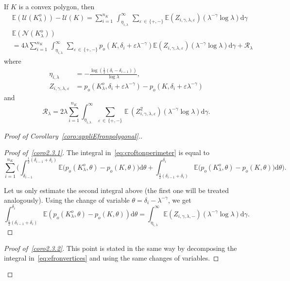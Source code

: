 \documentclass[AHL,Unicode,longabstracts,published]{cedram}
\newcommand{\cN}{\mathcal{N}}
\newcommand{\cR}{\mathcal{R}}
\newcommand{\cU}{\mathcal{U}}
\newcommand{\dd}{\mathrm{d}}
\newcommand{\E}{\mathbb{E}}
\newcommand{\eps}{\varepsilon}
\newcommand{\noi}{\noindent}
\newenvironment*{prooff}{\begin{proof}}{\let\qed\relax\end{proof}}
\newenvironment*{lastprooff}{\begin{proof}}{\end{proof}}
\begin{document}
\begin{coro}\label{coro:appliEfronpolygonal}
If $K$ is a convex polygon, then
\begin{align}
\tag{$\rm i$}\label{coro2.3.1} &\E(\cU(K_{\lambda}^o))-\cU(K) = \sum_{i=1}^{n_K}\,\int_{\eta_{i,\lambda}}^{\infty}\,\sum_{\varepsilon\,\in\,\{+,-\}} \E\left(Z_{i,\gamma,\lambda,\eps}\right)(\lambda^{-\gamma}\log \lambda)\dd\gamma \\
\tag{$\rm ii$}\label{coro2.3.2}  &\E(\cN(K_{\lambda}^o))\\
&= 4\lambda\sum_{i=1}^{n_K}\,\int_{\eta_{i,\lambda}}^{\infty}\,\sum_{\varepsilon\,\in\,\{+,-\}}p_o\left(K,\delta_i+\varepsilon\lambda^{-\gamma}\right)
\E(Z_{i,\gamma,\lambda,\eps})\left(\lambda^{-\gamma}\log\lambda\right)\dd\gamma+{\cR}_\lambda\nonumber
\end{align}
where
\begin{align*}
\eta_{i,\lambda}&=-\frac{\log \left(\frac{1}{2}(\delta_i-\delta_{i-1})\right)}{\log\lambda},\\
Z_{i,\gamma,\lambda,\eps}&= p_o\left(K_{\lambda}^o,\delta_i+\varepsilon\lambda^{-\gamma}\right)-p_o\left(K,\delta_i+\varepsilon\lambda^{-\gamma}\right)
\end{align*}
and
\begin{equation}\label{eq:defRlambdapolyg}
{\cR}_\lambda=2\lambda \sum_{i=1}^{n_K} \int_{\eta_{i,\lambda}}^{\infty} \sum_{\varepsilon\,\in\,\{+,-\}}\,\E\,\left(Z_{i,\gamma,\lambda,\eps}^2\right)\left(\lambda^{-\gamma}\log \lambda\right)\dd\gamma.
\end{equation}
\end{coro}

\begin{proof}[{Proof of Corollary~\ref{coro:appliEfronpolygonal}.}]

\begin{prooff}[{Proof of~\eqref{coro2.3.1}}]
The integral in~\eqref{eq:croftonperimeter} is equal to
\[
\sum_{i=1}^{n_K} \bigg(\int_{\delta_{i-1}}^{\frac1{2}\left(\delta_{i-1}+\delta_{i}\right)} \E\big(p_o(K_{\lambda}^o,\theta)-p_o(K,\theta)\big)\dd\theta + \int_{\frac1{2}\left(\delta_{i-1}+\delta_{i}\right)}^{\delta_{i}} \E\big(p_o(K_{\lambda}^o,\theta)-p_o(K,\theta)\big)\dd\theta\bigg).
\]

Let us only estimate the second integral above (the first one will be treated analogously). Using the change of variable $\theta=\delta_i-\lambda^{-\gamma}$, we get
\begin{equation*}\label{eq:perimpolyginterm0}
\int_{\frac1{2}\left(\delta_{i-1}+\delta_i\right)}^{\delta_i} \E(p_o(K_{\lambda}^o,\theta)-p_o(K,\theta))\dd\theta = \int_{\eta_{i,\lambda}}^{\infty} \E(Z_{i,\gamma,\lambda,-})(\lambda^{-\gamma}\log \lambda)\dd\gamma.
\end{equation*}
\end{prooff}
\begin{lastprooff}[{Proof of~\eqref{coro2.3.2}}]
This point is stated in the same way by decomposing the integral in~\eqref{eq:efronvertices} and using the same changes of variables.
\end{lastprooff}\let\qed\relax
\end{proof}
\end{document}
